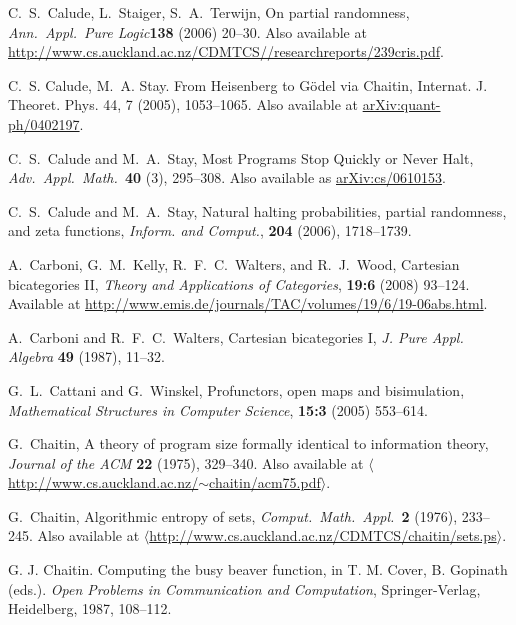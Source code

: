 \documentclass[12pt,twoside,openright]{report}
\begin{document}
\begin{thebibliography}{99}
 C.\ S.\ Calude, L.\ Staiger, S.\ A.\ Terwijn, On partial randomness, {\sl Ann.\ Appl.\ Pure Logic}\textbf{138} (2006)
20--30. Also available at
\href{http://www.cs.auckland.ac.nz/CDMTCS//researchreports/239cris.pdf}
{http://www.cs.auckland.ac.nz/CDMTCS//researchreports/239cris.pdf}.

 C.~S. Calude, M.~A. Stay. From Heisenberg to G\"odel via Chaitin,  Internat. J. Theoret. Phys.  44, 7 (2005), 1053--1065.  Also available at \href{http://arxiv.org/abs/quant-ph/0402197}{arXiv:quant-ph/0402197}.

 C.\ S.\ Calude and M.\ A.\ Stay, Most Programs Stop Quickly or Never Halt, 
{\sl Adv.\ Appl.\ Math.\ }\textbf{40} (3), 295--308. Also available as
\href{http://arxiv.org/abs/cs/0610153}
{arXiv:cs/0610153}.

 C.\ S.\ Calude and M.\ A.\ Stay, Natural halting probabilities, partial randomness, and zeta functions, \textsl{Inform. and Comput.}, \textbf{204} (2006), 
1718--1739. 

 A.\ Carboni, G.\ M.\ Kelly, R.\ F.\ C.\ Walters, and R.\ J.\ Wood, Cartesian bicategories II, \textsl{Theory and Applications of Categories}, {\bf 19:6} (2008) 93--124.  Available at \href{http://www.emis.de/journals/TAC/volumes/19/6/19-06abs.html}{http://www.emis.de/journals/TAC/volumes/19/6/19-06abs.html}.

 A.\ Carboni and R.\ F.\ C.\ Walters, Cartesian bicategories I, \textsl{J. Pure Appl. Algebra} \textbf{49} (1987), 11--32.

 G.\ L.\ Cattani and G.\ Winskel, Profunctors, open maps and bisimulation, \textsl{Mathematical Structures in Computer Science}, \textbf{15:3} (2005) 553--614.

 G.\ Chaitin, A theory of program size formally identical to information theory, {\sl Journal of the ACM} \textbf{22}
(1975), 329--340. Also available at
\href{http://www.cs.auckland.ac.nz/~chaitin/acm75.pdf}
{$\langle$http://www.cs.auckland.ac.nz/$\sim$chaitin/acm75.pdf$\rangle$}.

 G.\ Chaitin, Algorithmic entropy of sets, 
{\sl Comput.\ Math.\ Appl.\ }\textbf{2} (1976), 
233--245.  Also available at \hfill \break
\href{http://www.cs.auckland.ac.nz/CDMTCS/chaitin/sets.ps}
{$\langle$http://www.cs.auckland.ac.nz/CDMTCS/chaitin/sets.ps$\rangle$}.

G. J. Chaitin.  Computing the busy beaver function, in T. M. Cover, B. Gopinath (eds.).  \textsl{Open Problems in Communication and Computation}, Springer-Verlag, Heidelberg, 1987, 108--112.


\end{thebibliography}
\end{document}
